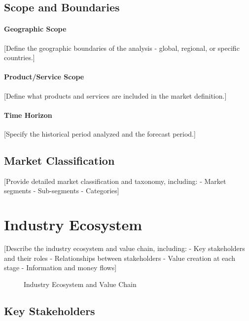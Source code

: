 \documentclass[11pt,letterpaper]{report}
\begin{document}
\subsection{Scope and Boundaries}

\paragraph{Geographic Scope}
[Define the geographic boundaries of the analysis - global, regional, or specific countries.]

\paragraph{Product/Service Scope}
[Define what products and services are included in the market definition.]

\paragraph{Time Horizon}
[Specify the historical period analyzed and the forecast period.]

\subsection{Market Classification}

[Provide detailed market classification and taxonomy, including:
- Market segments
- Sub-segments
- Categories]

\section{Industry Ecosystem}


[Describe the industry ecosystem and value chain, including:
- Key stakeholders and their roles
- Relationships between stakeholders
- Value creation at each stage
- Information and money flows]

\begin{figure}[htbp]
\centering
\caption{Industry Ecosystem and Value Chain}
\label{fig:ecosystem}
\end{figure}

\subsection{Key Stakeholders}
\end{document}
